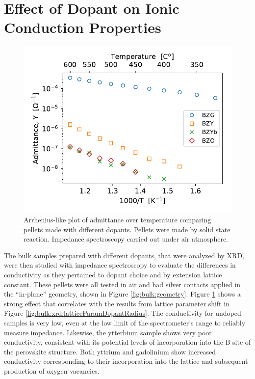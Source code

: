 \vspace{12pt}
\section{Effect of Dopant on Ionic Conduction Properties}

\begin{figure}
\centering
\includegraphics{Figures/190617-arr-admit-pellet-dopant-air.pdf}
\caption{Arrhenius-like plot of admittance over temperature comparing pellets made with different dopants. Pellets were made by solid state reaction. Impedance spectroscopy carried out under air atmosphere.}
\label{fig:bulk:arr:dopants}
\end{figure}

The bulk samples prepared with different dopants, that were analyzed by XRD, were then studied with impedance spectroscopy to evaluate the differences in conductivity as they pertained to dopant choice and by extension lattice constant. These pellets were all tested in air and had silver contacts applied in the ``in-plane'' geometry, shown in Figure \ref{fig:bulk:geometry}. Figure \ref{fig:bulk:arr:dopants} shows a strong effect that correlates with the results from lattice parameter shift in Figure \ref{fig:bulk:xrd:latticeParamDopantRadius}. The conductivity for undoped samples is very low, even at the low limit of the spectrometer's range to reliably measure impedance. Likewise, the ytterbium sample shows very poor conductivity, consistent with its potential levels of incorporation into the B site of the perovskite structure. Both yttrium and gadolinium show increased conductivity corresponding to their incorporation into the lattice and subsequent production of oxygen vacancies. 

